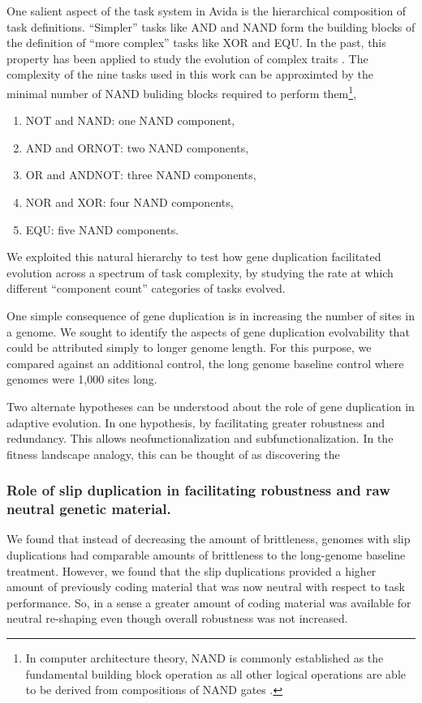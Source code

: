 One salient aspect of the task system in Avida is the hierarchical composition of task definitions.
``Simpler'' tasks like AND and NAND form the building blocks of the definition of ``more complex'' tasks like XOR and EQU.
In the past, this property has been applied to study the evolution of complex traits \citep{TODO}.
The complexity of the nine tasks used in this work can be approximted by the minimal number of NAND buliding blocks required to perform them\footnote{
In computer architecture theory, NAND is commonly established as the fundamental building block operation as all other logical operations are able to be derived from compositions of NAND gates \citep{TODO}.
},
\begin{enumerate}
\item NOT and NAND: one NAND component,
\item AND and ORNOT: two NAND components,
\item OR and ANDNOT: three NAND components,
\item NOR and XOR: four NAND components,
\item EQU: five NAND components.
\end{enumerate}
We exploited this natural hierarchy to test how gene duplication facilitated evolution across a spectrum of task complexity, by studying the rate at which different ``component count'' categories of tasks evolved.

One simple consequence of gene duplication is in increasing the number of sites in a genome.
We sought to identify the aspects of gene duplication evolvability that could be attributed simply to longer genome length.
For this purpose, we compared against an additional control, the long genome baseline control where genomes were 1,000 sites long.

Two alternate hypotheses can be understood about the role of gene duplication in adaptive evolution.
In one hypothesis, by facilitating greater robustness and redundancy.
This allows neofunctionalization and subfunctionalization.
In the fitness landscape analogy, this can be thought of as discovering the

\subsubsection{Role of slip duplication in facilitating robustness and raw neutral genetic material.}

We found that instead of decreasing the amount of brittleness, genomes with slip duplications had comparable amounts of brittleness to the long-genome baseline treatment.
However, we found that the slip duplications provided a higher amount of previously coding material that was now neutral with respect to task performance.
So, in a sense a greater amount of coding material was available for neutral re-shaping even though overall robustness was not increased.

